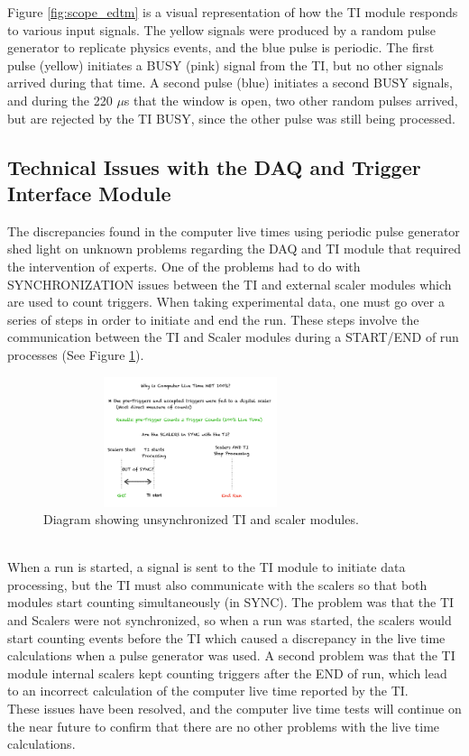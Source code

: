 \documentclass[letterpaper, 12 pt, conference]{ieeeconf}  %
\begin{document}
Figure \ref{fig:scope_edtm} is a visual representation of how the TI module responds to various input signals. The yellow signals were produced by
a random pulse generator to replicate physics events, and the blue pulse is periodic. The first pulse (yellow) initiates a BUSY (pink) signal from the
TI, but no other signals arrived during that time. A second pulse (blue) initiates a second BUSY signals, and during the 220 $\mu$s that the window
is open, two other random pulses arrived, but are rejected by the TI BUSY, since the other pulse was still being processed.

\subsection{Technical Issues with the DAQ and Trigger Interface Module}
\noindent The discrepancies found in the computer live times using periodic pulse generator shed light on unknown problems regarding the DAQ and TI
module that required the intervention of experts. One of the problems had to do with SYNCHRONIZATION issues between the TI and external scaler modules
which are used to count triggers. When taking experimental data, one must go over a series of steps in order to initiate and end the run. These steps
involve the communication between the TI and Scaler modules during a START/END of run processes (See Figure \ref{fig:TI_sync}). 
\begin{figure}[h!]
  \centering
  \includegraphics[width=3.4in, height=1.5in]{edtm/TI_Scaler_SYNC.pdf}
  \caption{Diagram showing unsynchronized TI and scaler modules.}
  \label{fig:TI_sync}
\end{figure}\\
When a run is started, a signal is sent to the TI module to initiate data processing, but the TI must also communicate with the scalers so that both
modules start counting simultaneously (in SYNC). The problem was that the TI and Scalers were not synchronized, so when a run was started, the scalers
would start counting events before the TI which caused a discrepancy in the live time calculations when a pulse generator was used. A second problem
was that the TI module internal scalers kept counting triggers after the END of run, which lead to an incorrect calculation of the computer live time
reported by the TI. \\
\indent These issues have been resolved, and the computer live time tests will continue on the near future to confirm that there are no other problems
with the live time calculations.
\end{document}
